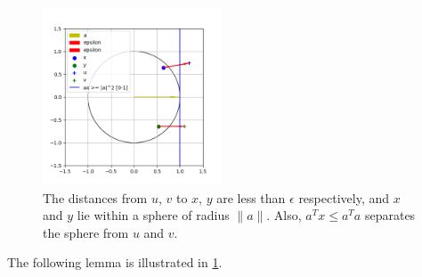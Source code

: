 \begin{figure}[ht]
	\centering
	\includegraphics[width=200px]{images/spokes.png}
	\caption[
    		A depiction of the quantities within \cref{properties_of_a_circle}.]{
			The distances from $u$, $v$ to $x$, $y$ are less than $\epsilon$ respectively, and $x$ and $y$ lie within a sphere of radius $\|a\|$.
			Also, $a^Tx \le a^Ta$ separates the sphere from $u$ and $v$.
	}
	\label{first_lemma}
\end{figure}
The following lemma is illustrated in \cref{first_lemma}.
